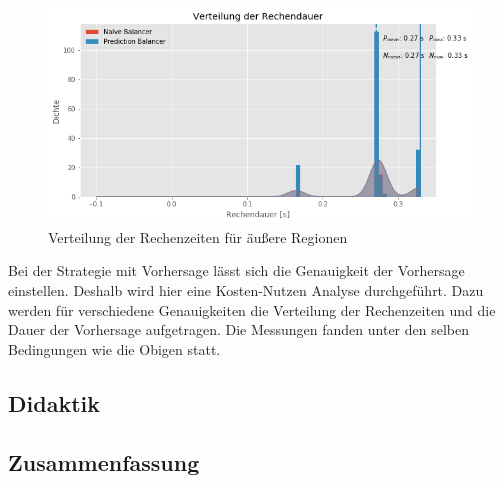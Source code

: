 \begin{figure}
	\centering
	\includegraphics[width=0.9\linewidth]{img/Evaluation/balancers/balancers_outside.png}
	\caption{Verteilung der Rechenzeiten für äußere Regionen}
	\label{fig:balancers_outside}
\end{figure}

Bei der Strategie mit Vorhersage lässt sich die Genauigkeit der Vorhersage einstellen.
Deshalb wird hier eine Kosten-Nutzen Analyse durchgeführt.
Dazu werden für verschiedene Genauigkeiten die Verteilung der Rechenzeiten und die Dauer der Vorhersage aufgetragen.
Die Messungen fanden unter den selben Bedingungen wie die Obigen statt.

%

\subsection{Didaktik}

\subsection{Zusammenfassung}
